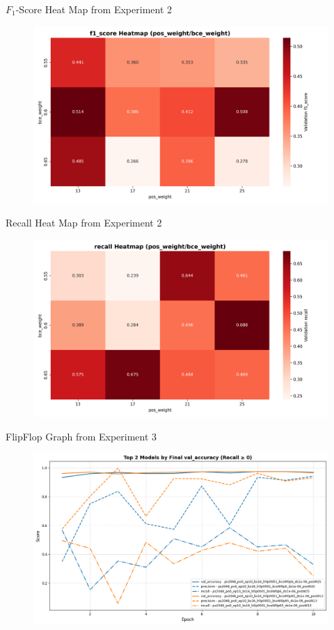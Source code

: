 \documentclass{beamer}
\begin{document}
\begin{frame}{$F_1$-Score Heat Map from Experiment 2}
    \begin{figure}
        \centering
        \includegraphics[height=0.7\textheight]{Images/12_heatmap_f1_score_by_weights.png}
    \end{figure}
\end{frame}

\begin{frame}{Recall Heat Map from Experiment 2}
    \begin{figure}
        \centering
        \includegraphics[height=0.7\textheight]{Images/12_heatmap_recall_by_weights.png}
    \end{figure}
\end{frame}

\begin{frame}{FlipFlop Graph from Experiment 3}
    \begin{figure}
        \centering
        \includegraphics[height=0.7\textheight]{Images/Exp3_acc_prec_rec.png}
    \end{figure}
\end{frame}
\end{document}
